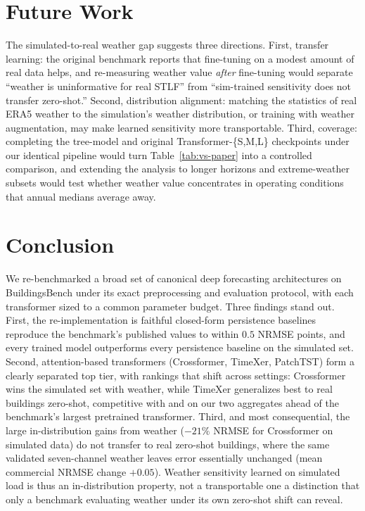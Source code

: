 \documentclass[11pt]{article}
\begin{document}
\section{Future Work}
\label{sec:future}
The simulated-to-real weather gap suggests three directions. First, transfer
learning: the original benchmark reports that fine-tuning on a modest amount of real
data helps, and re-measuring weather value \emph{after} fine-tuning would separate
``weather is uninformative for real STLF'' from ``sim-trained sensitivity does not
transfer zero-shot.'' Second, distribution alignment: matching the statistics of
real ERA5 weather to the simulation's weather distribution, or training with weather
augmentation, may make learned sensitivity more transportable. Third, coverage:
completing the tree-model and original Transformer-\{S,M,L\} checkpoints under our
identical pipeline would turn Table~\ref{tab:vs-paper} into a controlled comparison,
and extending the analysis to longer horizons and extreme-weather subsets would test
whether weather value concentrates in operating conditions that annual medians
average away.

\section{Conclusion}
\label{sec:conclusion}
We re-benchmarked a broad set of canonical deep forecasting architectures on
BuildingsBench under its exact preprocessing and evaluation protocol, with each
transformer sized to a common parameter budget. Three findings stand out. First,
the re-implementation is faithful closed-form persistence baselines reproduce the
benchmark's published values to within $0.5$ NRMSE points, and every trained model
outperforms every persistence baseline on the simulated
set. Second, attention-based transformers (Crossformer, TimeXer, PatchTST)
form a clearly separated top tier, with rankings that shift across settings:
Crossformer wins the simulated set with weather, while TimeXer generalizes best to
real buildings zero-shot, competitive with and on our two aggregates ahead of the
benchmark's largest pretrained transformer. Third, and most consequential, the
large in-distribution gains from weather ($-21\%$ NRMSE for Crossformer on simulated
data) do not transfer to real zero-shot buildings, where the same validated
seven-channel weather leaves error essentially unchanged (mean commercial NRMSE
change $+0.05$). Weather sensitivity learned on simulated load is thus an
in-distribution property, not a transportable one a distinction that only a
benchmark evaluating weather under its own zero-shot shift can reveal.



\end{document}
